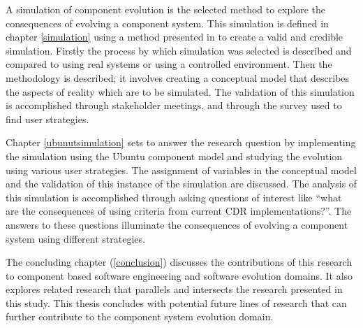 A simulation of component evolution is the selected method to explore the consequences of evolving a component system.
This simulation is defined in chapter \ref{simulation} using a method presented in \cite{Law2005} to create a valid and credible simulation.
Firstly the process by which simulation was selected is described and compared to using real systems or using a controlled environment.
Then the methodology is described; it involves creating a conceptual model that describes the aspects of reality which are to be simulated.
The validation of this simulation is accomplished through stakeholder meetings, and through the survey used to find user strategies.

Chapter \ref{ubunutsimulation} sets to answer the research question by implementing the simulation using the Ubuntu component model 
and studying the evolution using various user strategies.
The assignment of variables in the conceptual model and the validation of this instance of the simulation are discussed.
The analysis of this simulation is accomplished through asking questions of interest like ``what are the consequences of using criteria from current CDR implementations?''.
The answers to these questions illuminate the consequences of evolving a component system using different strategies.

The concluding chapter (\ref{conclusion}) discusses the contributions of this research to component based software engineering and software evolution domains.
It also explores related research that parallels and intersects the research presented in this study.
This thesis concludes with potential future lines of research that can further contribute to the component system evolution domain. 
